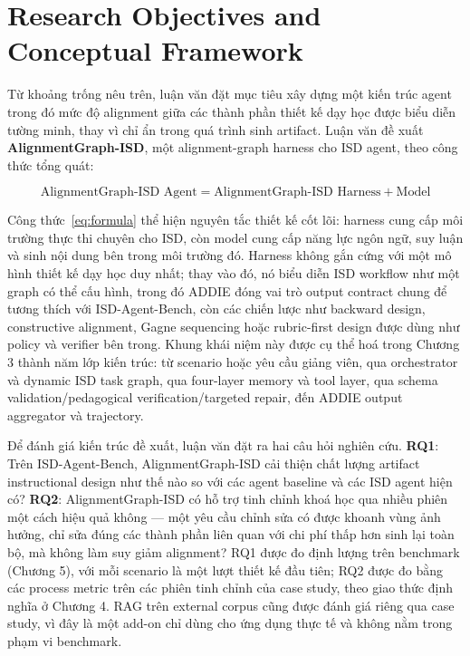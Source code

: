 \documentclass[../main.tex]{subfiles}
\begin{document}
\section{Research Objectives and Conceptual Framework}

Từ khoảng trống nêu trên, luận văn đặt mục tiêu xây dựng một kiến trúc agent trong đó mức độ alignment giữa các thành phần thiết kế dạy học được biểu diễn tường minh, thay vì chỉ ẩn trong quá trình sinh artifact. Luận văn đề xuất \textbf{AlignmentGraph-ISD}, một alignment-graph harness cho ISD agent, theo công thức tổng quát:

\begin{equation}\label{eq:formula}
    \text{AlignmentGraph-ISD Agent} = \text{AlignmentGraph-ISD Harness} + \text{Model}
\end{equation}

Công thức~\eqref{eq:formula} thể hiện nguyên tắc thiết kế cốt lõi: harness cung cấp môi trường thực thi chuyên cho ISD, còn model cung cấp năng lực ngôn ngữ, suy luận và sinh nội dung bên trong môi trường đó. Harness không gắn cứng với một mô hình thiết kế dạy học duy nhất; thay vào đó, nó biểu diễn ISD workflow như một graph có thể cấu hình, trong đó ADDIE đóng vai trò output contract chung để tương thích với ISD-Agent-Bench, còn các chiến lược như backward design, constructive alignment, Gagne sequencing hoặc rubric-first design được dùng như policy và verifier bên trong. Khung khái niệm này được cụ thể hoá trong Chương 3 thành năm lớp kiến trúc: từ scenario hoặc yêu cầu giảng viên, qua orchestrator và dynamic ISD task graph, qua four-layer memory và tool layer, qua schema validation/pedagogical verification/targeted repair, đến ADDIE output aggregator và trajectory.

Để đánh giá kiến trúc đề xuất, luận văn đặt ra hai câu hỏi nghiên cứu. \textbf{RQ1}: Trên ISD-Agent-Bench, AlignmentGraph-ISD cải thiện chất lượng artifact instructional design như thế nào so với các agent baseline và các ISD agent hiện có? \textbf{RQ2}: AlignmentGraph-ISD có hỗ trợ tinh chỉnh khoá học qua nhiều phiên một cách hiệu quả không — một yêu cầu chỉnh sửa có được khoanh vùng ảnh hưởng, chỉ sửa đúng các thành phần liên quan với chi phí thấp hơn sinh lại toàn bộ, mà không làm suy giảm alignment? RQ1 được đo định lượng trên benchmark (Chương 5), với mỗi scenario là một lượt thiết kế đầu tiên; RQ2 được đo bằng các process metric trên các phiên tinh chỉnh của case study, theo giao thức định nghĩa ở Chương 4. \gls{RAG} trên external corpus cũng được đánh giá riêng qua case study, vì đây là một add-on chỉ dùng cho ứng dụng thực tế và không nằm trong phạm vi benchmark.
\end{document}
